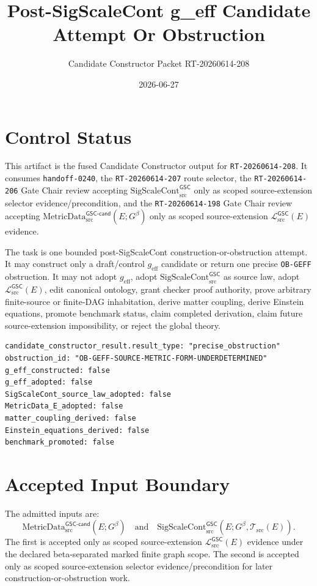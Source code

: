 \documentclass[11pt]{article}
\title{Post-SigScaleCont g\_eff Candidate Attempt Or Obstruction}
\author{Candidate Constructor Packet RT-20260614-208}
\date{2026-06-27}
\newcommand{\MetricDataCand}{\mathrm{MetricData}_{\mathrm{src}}^{\mathsf{GSC\mbox{-}cand}}}
\newcommand{\MetricData}{\mathcal{L}_{\mathrm{src}}^{\mathsf{GSC}}}
\newcommand{\Gbeta}{G^{\beta}}
\newcommand{\geff}{g_{\mathrm{eff}}}
\newcommand{\SigScaleCont}{\mathrm{SigScaleCont}_{\mathrm{src}}^{\mathsf{GSC}}}
\begin{document}
\maketitle

\section{Control Status}

This artifact is the fused Candidate Constructor output for
\texttt{RT-20260614-208}. It consumes \texttt{handoff-0240}, the
\texttt{RT-20260614-207} route selector, the \texttt{RT-20260614-206}
Gate Chair review accepting \(\SigScaleCont\) only as scoped source-extension
selector evidence/precondition, and the \texttt{RT-20260614-198} Gate Chair
review accepting \(\MetricDataCand(E;\Gbeta)\) only as scoped source-extension
\(\MetricData(E)\) evidence.

The task is one bounded post-SigScaleCont construction-or-obstruction attempt.
It may construct only a draft/control \(\geff\) candidate or return one
precise \texttt{OB-GEFF} obstruction. It may not adopt \(\geff\), adopt
\(\SigScaleCont\) as source law, adopt \(\MetricData(E)\), edit canonical
ontology, grant checker proof authority, prove arbitrary finite-source or
finite-DAG inhabitation, derive matter coupling, derive Einstein equations,
promote benchmark status, claim completed derivation, claim future
source-extension impossibility, or reject the global theory.

\begin{verbatim}
candidate_constructor_result.result_type: "precise_obstruction"
obstruction_id: "OB-GEFF-SOURCE-METRIC-FORM-UNDERDETERMINED"
g_eff_constructed: false
g_eff_adopted: false
SigScaleCont_source_law_adopted: false
MetricData_E_adopted: false
matter_coupling_derived: false
Einstein_equations_derived: false
benchmark_promoted: false
\end{verbatim}

\section{Accepted Input Boundary}

The admitted inputs are:
\[
  \MetricDataCand(E;\Gbeta)
  \quad\text{and}\quad
  \SigScaleCont(E;\Gbeta,\mathcal T_{\mathrm{src}}(E)).
\]
The first is accepted only as scoped source-extension \(\MetricData(E)\)
evidence under the declared beta-separated marked finite graph scope. The
second is accepted only as scoped source-extension selector
evidence/precondition for later construction-or-obstruction work.
\end{document}

